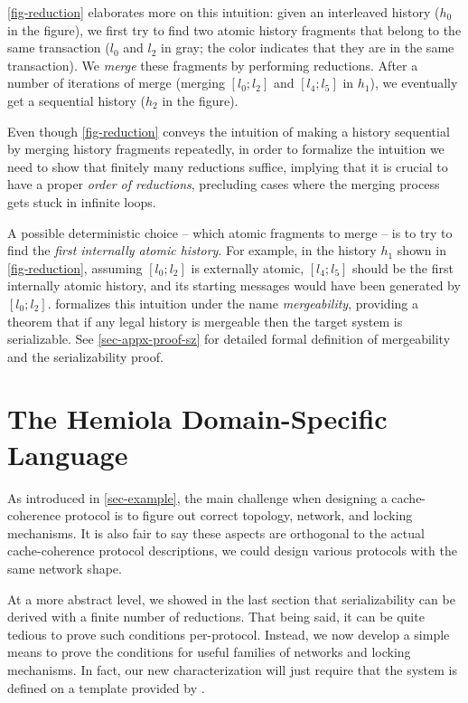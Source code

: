 \documentclass[sigplan,10pt,review,anonymous,screen]{acmart}\settopmatter{printfolios=true,printccs=false,printacmref=false}
\begin{document}
\autoref{fig-reduction} elaborates more on this intuition: given an interleaved history ($h_0$ in the figure), we first try to find two atomic history fragments that belong to the same transaction ($l_0$ and $l_2$ in gray; the color indicates that they are in the same transaction).
We \emph{merge} these fragments by performing reductions.
After a number of iterations of merge (merging $[l_0; l_2]$ and $[l_4; l_5]$ in $h_1$), we eventually get a sequential history ($h_2$ in the figure).

Even though \autoref{fig-reduction} conveys the intuition of making a history sequential by merging history fragments repeatedly, in order to formalize the intuition we need to show that finitely many reductions suffice,
implying that it is crucial to have a proper \emph{order of reductions}, precluding cases where the merging process gets stuck in infinite loops.

A possible deterministic choice -- which atomic fragments to merge -- is to try to find the \emph{first internally atomic history}.
For example, in the history $h_1$ shown in \autoref{fig-reduction}, assuming $[l_0; l_2]$ is externally atomic, $[l_4; l_5]$ should be the first internally atomic history, and its starting messages would have been generated by $[l_0; l_2]$.
\hemiola{} formalizes this intuition under the name \emph{mergeability}, providing a theorem that if any legal history is mergeable then the target system is serializable.
See \autoref{sec-appx-proof-sz} for detailed formal definition of mergeability and the serializability proof.

\section{The Hemiola Domain-Specific Language}
\label{sec-hemiola-dsl}

As introduced in \autoref{sec-example}, the main challenge when designing a cache-coherence protocol is to figure out correct topology, network, and locking mechanisms.
It is also fair to say these aspects are orthogonal to the actual cache-coherence protocol descriptions, \ie{} we could design various protocols with the same network shape.

At a more abstract level, we showed in the last section that serializability can be derived with a finite number of reductions.
That being said, it can be quite tedious to prove such conditions per-protocol.
Instead, we now develop a simple means to prove the conditions for useful families of networks and locking mechanisms.
In fact, our new characterization will just require that the system is defined on a template provided by \hemiola{}.
\end{document}
